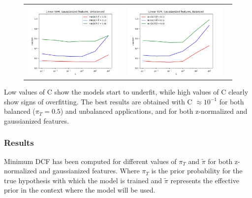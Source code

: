 \documentclass[12pt,a4paper]{article}
\begin{document}
\begin{figure}[H]
    \begin{center}
        \hspace*{-25pt}
        \begin{tabular}{ccc}
            \includegraphics[width = 200pt]{img/evaluation_plots/C-svm-gaussianized-unbalanced.png} &
            \includegraphics[width = 200pt]{img/evaluation_plots/C-svm-gaussianized-balanced.png}     \\
        \end{tabular}
    \end{center}
\end{figure}

Low values of C show the models start to underfit, while high values of C clearly show signs of overfitting.
The best results are obtained with C $\approx 10^{-1}$ for both balanced ($\pi_T = 0.5$) and unbalanced applications, and for both z-normalized and gaussianized features.

\subsubsection{Results}

Minimum DCF has been computed for different values of \(\pi_T\) and \(\tilde{\pi}\) for both z-normalized and gaussianized features.
Where $ \pi_T $ is the prior probability for the true hypothesis with which the model is trained and $ \tilde{\pi} $ represents the effective prior in the context where the model will be used.
\end{document}
